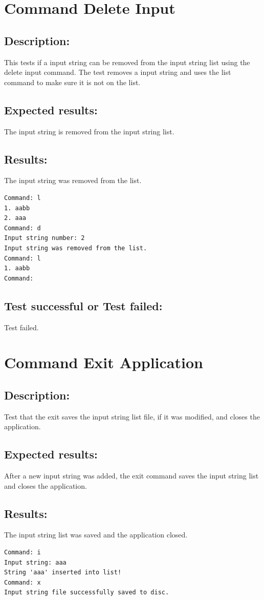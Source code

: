 \documentclass{report}
\begin{document}
 
 
 
 
\chapter{Command Delete Input}
\section{Description:} 
This tests if a input string can be removed from the input string list using the delete input command. The test removes a input string and uses the list command to make sure it is not on the list.

\section{Expected results:} The input string is removed from the input string list.
\section{Results:} The input string was removed from the list.
\begin{verbatim}
Command: l
1. aabb
2. aaa
Command: d
Input string number: 2
Input string was removed from the list.
Command: l
1. aabb
Command:
\end{verbatim}
\section{Test successful or Test failed:} Test failed.
\pagebreak




\chapter{Command Exit Application}
\section{Description:} Test that the exit saves the input string list file, if it was modified, and closes the application.
\section{Expected results:} After a new input string was added, the exit command saves the input string list and closes the application.
\section{Results:} The input string list was saved and the application closed.
\begin{verbatim}
Command: i
Input string: aaa
String 'aaa' inserted into list!
Command: x
Input string file successfully saved to disc.
\end{verbatim}
\end{document}
